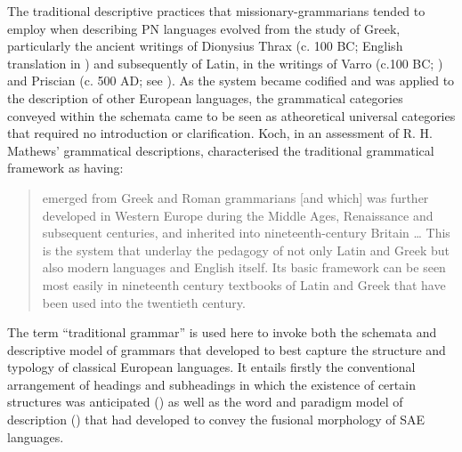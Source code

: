 The traditional descriptive practices that missionary-grammarians tended to employ when describing PN languages evolved from the study of Greek, particularly the ancient writings of Dionysius Thrax (c. 100 BC; English translation in \citealt{thrax_tekne_1986}) and subsequently of Latin, in the writings of Varro (c.100 BC; \citealt{Varro_1996}) and Priscian (c. 500 AD; see \citealt{luhtala_amsterdam_2005}). As the system became codified and was applied to the description of other European languages, the grammatical categories conveyed within the schemata came to be seen as atheoretical universal categories that required no introduction or clarification. Koch, in an assessment of R. H. Mathews' grammatical descriptions, characterised the traditional grammatical framework as having:
\begin{quote}
    emerged from Greek and Roman grammarians [and which] was further developed in Western Europe during the Middle Ages, Renaissance and subsequent centuries, and inherited into nineteenth-century Britain … This is the system that underlay the pedagogy of not only Latin and Greek but also modern languages and English itself. Its basic framework can be seen most easily in nineteenth century textbooks of Latin and Greek that have been used into the twentieth century. \citep[187]{koch_r_2008}
\end{quote}

The term “traditional grammar” is used here to invoke both the schemata and descriptive model of grammars that developed to best capture the structure and typology of classical European languages. It entails firstly the conventional arrangement of headings and subheadings in which the existence of certain structures was anticipated () as well as the word and paradigm model of description () that had developed to convey the fusional morphology of SAE languages.

